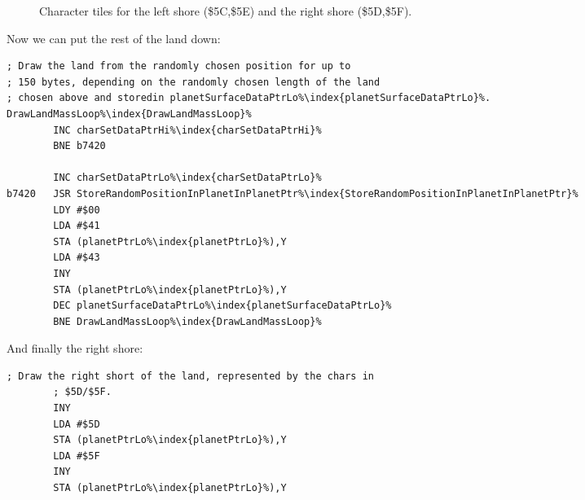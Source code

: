 \begin{figure}[H]
{
  \setlength{\tabcolsep}{3.0pt}
  \setlength\cmidrulewidth{\heavyrulewidth} %
    \begin{adjustbox}{width=15cm,center}
  \begin{subfigure}{0.3\textwidth}
  
  \end{subfigure}
  \begin{subfigure}{0.3\textwidth}
  
  \end{subfigure}
  \begin{subfigure}{0.3\textwidth}
  
  \end{subfigure}
  \begin{subfigure}{0.3\textwidth}
  
  \end{subfigure}
  \end{adjustbox}
}\caption[]{Character tiles for the left shore (\$5C,\$5E) and the right shore (\$5D,\$5F).}
\end{figure}

Now we can put the rest of the land down:

\begin{lstlisting}[caption=Write pairs of \icode{\$41,\$43} for the main land mass.,escapechar=\%]
; Draw the land from the randomly chosen position for up to
; 150 bytes, depending on the randomly chosen length of the land
; chosen above and storedin planetSurfaceDataPtrLo%\index{planetSurfaceDataPtrLo}%.
DrawLandMassLoop%\index{DrawLandMassLoop}%   
        INC charSetDataPtrHi%\index{charSetDataPtrHi}%
        BNE b7420

        INC charSetDataPtrLo%\index{charSetDataPtrLo}%
b7420   JSR StoreRandomPositionInPlanetInPlanetPtr%\index{StoreRandomPositionInPlanetInPlanetPtr}%
        LDY #$00
        LDA #$41
        STA (planetPtrLo%\index{planetPtrLo}%),Y
        LDA #$43
        INY
        STA (planetPtrLo%\index{planetPtrLo}%),Y
        DEC planetSurfaceDataPtrLo%\index{planetSurfaceDataPtrLo}%
        BNE DrawLandMassLoop%\index{DrawLandMassLoop}%
\end{lstlisting}

And finally the right shore:

\begin{lstlisting}[caption=Drawing the right hand shore..,escapechar=\%]
        ; Draw the right short of the land, represented by the chars in
        ; $5D/$5F.
        INY
        LDA #$5D
        STA (planetPtrLo%\index{planetPtrLo}%),Y
        LDA #$5F
        INY
        STA (planetPtrLo%\index{planetPtrLo}%),Y
\end{lstlisting}



